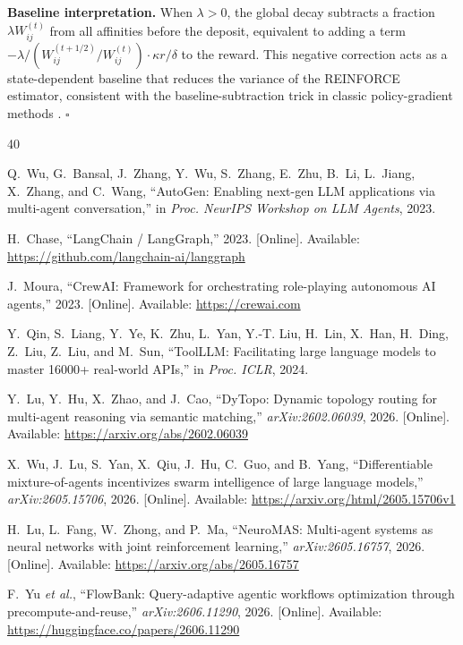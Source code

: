 \documentclass[journal,twocolumn,letterpaper]{IEEEtran}
\begin{document}
\medskip
\noindent\textbf{Baseline interpretation.}
When $\lambda>0$, the global decay subtracts a fraction $\lambda W_{ij}^{(t)}$
from all affinities before the deposit, equivalent to adding a term
$-\lambda/(W_{ij}^{(t+1/2)}/W_{ij}^{(t)}) \cdot\kappa r/\delta$ to the reward.
This negative correction acts as a state-dependent baseline that reduces the
variance of the REINFORCE estimator, consistent with the baseline-subtraction
trick in classic policy-gradient methods \cite{sutton2018rl}.  \hfill$\square$

\begin{thebibliography}{40}

Q.~Wu, G.~Bansal, J.~Zhang, Y.~Wu, S.~Zhang, E.~Zhu, B.~Li, L.~Jiang,
  X.~Zhang, and C.~Wang, ``AutoGen: Enabling next-gen LLM applications via
  multi-agent conversation,'' in \emph{Proc. NeurIPS Workshop on LLM Agents},
  2023.

H.~Chase, ``LangChain / LangGraph,'' 2023. [Online]. Available:
  \url{https://github.com/langchain-ai/langgraph}

J.~Moura, ``CrewAI: Framework for orchestrating role-playing autonomous
  AI agents,'' 2023. [Online]. Available: \url{https://crewai.com}

Y.~Qin, S.~Liang, Y.~Ye, K.~Zhu, L.~Yan, Y.-T. Liu, H.~Lin, X.~Han,
  H.~Ding, Z.~Liu, Z.~Liu, and M.~Sun, ``ToolLLM: Facilitating large language
  models to master 16000+ real-world APIs,'' in \emph{Proc. ICLR}, 2024.

Y.~Lu, Y.~Hu, X.~Zhao, and J.~Cao, ``DyTopo: Dynamic topology routing for
  multi-agent reasoning via semantic matching,'' \emph{arXiv:2602.06039}, 2026.
  [Online]. Available: \url{https://arxiv.org/abs/2602.06039}

X.~Wu, J.~Lu, S.~Yan, X.~Qiu, J.~Hu, C.~Guo, and B.~Yang, ``Differentiable
  mixture-of-agents incentivizes swarm intelligence of large language
  models,'' \emph{arXiv:2605.15706}, 2026. [Online]. Available:
  \url{https://arxiv.org/html/2605.15706v1}

H.~Lu, L.~Fang, W.~Zhong, and P.~Ma, ``NeuroMAS: Multi-agent systems as
  neural networks with joint reinforcement learning,''
  \emph{arXiv:2605.16757}, 2026. [Online]. Available:
  \url{https://arxiv.org/abs/2605.16757}

F.~Yu \emph{et al.}, ``FlowBank: Query-adaptive agentic workflows
  optimization through precompute-and-reuse,'' \emph{arXiv:2606.11290}, 2026.
  [Online]. Available: \url{https://huggingface.co/papers/2606.11290}


\end{thebibliography}
\end{document}
